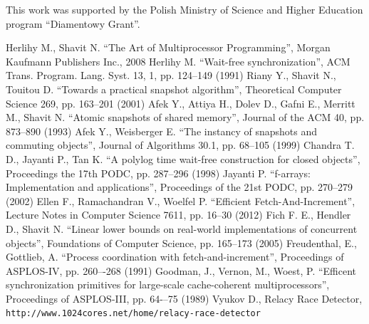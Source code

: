 \documentclass{thesis}
\begin{document}
This work was supported by the Polish Ministry of Science and Higher Education program ``Diamentowy Grant''.

\newpage

\begin{thebibliography}{9}
	 Herlihy M., Shavit N. ``The Art of Multiprocessor Programming'', Morgan Kaufmann Publishers Inc., 2008
	 Herlihy M. ``Wait-free synchronization'', ACM Trans. Program. Lang. Syst. 13, 1, pp. 124--149 (1991)
	 Riany Y., Shavit N., Touitou D. ``Towards a practical snapshot algorithm'', Theoretical Computer Science 269, pp. 163--201 (2001)
	 Afek Y., Attiya H., Dolev D., Gafni E., Merritt M., Shavit N. ``Atomic snapshots of shared memory'', Journal of the ACM 40, pp. 873--890 (1993)
	 Afek Y., Weisberger E. ``The instancy of snapshots and commuting objects'', Journal of Algorithms 30.1, pp. 68--105 (1999)
	 Chandra T. D., Jayanti P., Tan K. ``A polylog time wait-free construction for closed objects'', Proceedings the 17th PODC, pp. 287--296 (1998)
	 Jayanti P. ``f-arrays: Implementation and applications'', Proceedings of the 21st PODC, pp. 270--279 (2002)
	 Ellen F., Ramachandran V., Woelfel P. ``Efficient Fetch-And-Increment'', Lecture Notes in Computer Science 7611, pp. 16--30 (2012)
	 Fich F. E., Hendler D., Shavit N. ``Linear lower bounds on real-world implementations of concurrent objects'', Foundations of Computer Science, pp. 165--173 (2005)
	 Freudenthal, E., Gottlieb, A. ``Process coordination with fetch-and-increment'', Proceedings of ASPLOS-IV, pp. 260–-268 (1991)
	 Goodman, J., Vernon, M., Woest, P. ``Efficent synchronization primitives for large-scale cache-coherent multiprocessors'', Proceedings of ASPLOS-III, pp. 64-–75 (1989)
	 Vyukov D., Relacy Race Detector, \verb+http://www.1024cores.net/home/relacy-race-detector+
\end{thebibliography}
\end{document}

